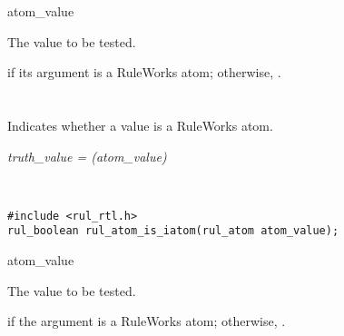 \begin{argument}
\item[atom\_value]
  
  The value to be tested.
\end{argument}

\ReturnValue

 if its argument is a RuleWorks  atom; otherwise,
.

\begin{seealso}



\end{seealso}

\section*{}

Indicates whether a value is a RuleWorks  atom.

\Syntax

\it{truth\_value} = (\it{atom\_value})

\begin{args}
\\
\end{args}

\CBinding
\begin{verbatim}
#include <rul_rtl.h>
rul_boolean rul_atom_is_iatom(rul_atom atom_value);
\end{verbatim}

\begin{arguments}

\item[atom\_value]

  The value to be tested.
\end{arguments}

\ReturnValue

 if the argument is a RuleWorks  atom; otherwise,
.

\begin{seealso}  



\end{seealso}
  
